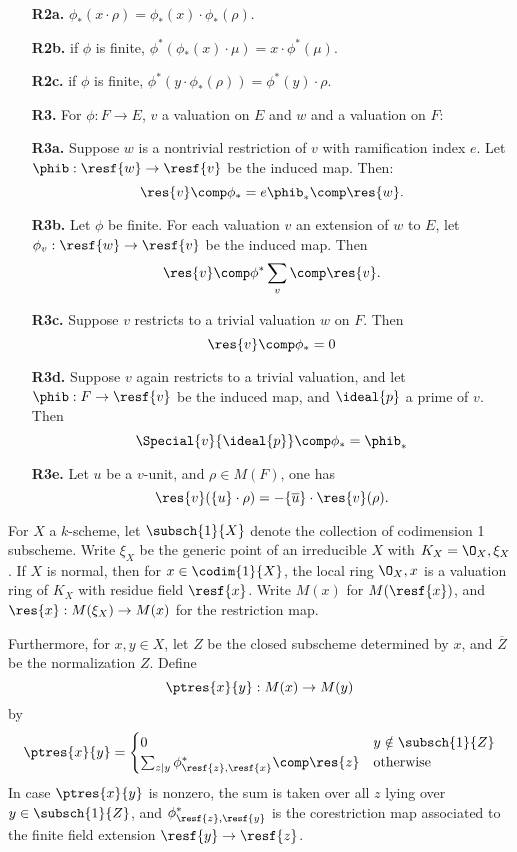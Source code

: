 \begin{defn}
\begin{enumerate}
\item[\textbf{R2a.}] $\phi_*(x \cdot \rho) = \phi_*(x) \cdot 
\phi_*(\rho)$.

\item[\textbf{R2b.}] if $\phi$ is finite, $\phi^*(\phi_*(x) \cdot 
\mu) = x \cdot \phi^*(\mu)$.

\item[\textbf{R2c.}] if $\phi$ is finite, $\phi^*(y \cdot 
\phi_*(\rho)) = \phi^*(y) \cdot \rho$.

\item[\textbf{R3.}] For $\phi: F \to E$, $v$ a valuation on $E$
and $w$ and a valuation on $F$:

\item[\textbf{R3a.}] Suppose $w$ is a nontrivial restriction of 
$v$ with ramification index $e$. Let $\phib: \resf{w} \to 
\resf{v}$ be the induced map. Then:
\[
\res{v} \comp \phi_* = e \phib_* \comp \res{w}.
\]

\item[\textbf{R3b.}] Let $\phi$ be finite. For each valuation $v$ 
an extension of $w$ to $E$, let $\phi_v: \resf{w} \to \resf{v}$
be the induced map. Then
\[
\res{v} \comp \phi^* \sum_{v} \comp \res{v}.
\]

\item[\textbf{R3c.}] Suppose $v$ restricts to a trivial valuation
$w$ on $F$. Then
\[
\res{v} \comp \phi_* = 0
\]

\item[\textbf{R3d.}] Suppose $v$ again restricts to a trivial 
valuation, and let $\phib: F \to \resf{v}$ be the induced map, and
$\ideal{p}$ a prime of $v$. Then
\[
\Special{v}{\ideal{p}} \comp \phi_* = \phib_*
\]

\item[\textbf{R3e.}] Let $u$ be a $v$-unit, and $\rho \in M(F)$,
one has
\[
\res{v}(\{u\} \cdot \rho) = -\{\overline{u}\} \cdot \res{v}(\rho).
\]
\end{enumerate}
\end{defn}

For $X$ a $k$-scheme, let $\subsch{1}{X}$ denote the collection of 
codimension 1 subscheme. Write $\xi_X$ be the generic point of an
irreducible $X$ with $K_X = \O_X,\xi_X$. If $X$ is normal, then 
for $x \in \codim{1}{X}$, the local ring $\O_X,x$ is a valuation 
ring of $K_X$ with residue field $\resf{x}$. Write $M(x)$ for 
$M(\resf{x})$, and $\res{x}: M(\xi_X) \to M(x)$ for the 
restriction map.

Furthermore, for $x, y \in X$, let $Z$ be the closed subscheme 
determined by $x$, and $\overline{Z}$ be the normalization $Z$.
Define
\[
\ptres{x}{y}: M(x) \to M(y)
\]
by
\[
\ptres{x}{y} = 
\begin{cases}
0 & y \notin \subsch{1}{Z} \\
\sum_{z|y} \phi_{\resf{z},\resf{x}}^* \comp \res{z} & \textrm{otherwise}
\end{cases}
\]
In case $\ptres{x}{y}$ is nonzero, the sum is taken over all $z$
lying over $y \in \subsch{1}{Z}$, and
$\phi_{\resf{z},\resf{y}}^*$ is the corestriction map associated to 
the finite field extension $\resf{y} \to \resf{z}$.

